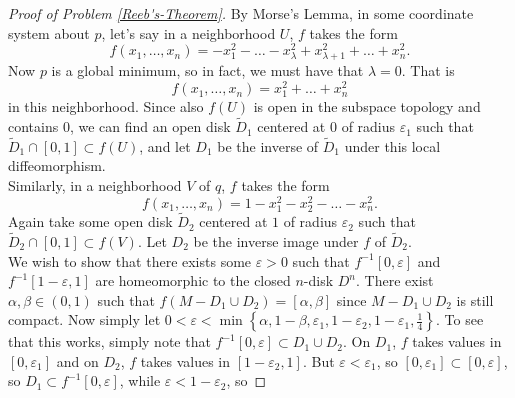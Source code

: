 \documentclass[reqno]{amsart}
\theoremstyle{definition}
\theoremstyle{remark}
\begin{document}
\begin{proof}[Proof of Problem \ref{Reeb's-Theorem}]
        By Morse's Lemma, in some coordinate system about
         $p$, let's say in a neighborhood $U$,
         $f$ takes the form
         \[
         f\left( x_1,\ldots,x_n \right) = 
         - x_1^2 - \ldots - x_{\lambda}^2 +
         x_{\lambda+1}^2 +\ldots + x_n^2.
         \] 
         Now $p$ is a global minimum, so in fact, we
         must have that $\lambda = 0$. That is
         \[
         f\left( x_1,\ldots,x_n \right) =
         x_{1}^2 + \ldots + x_n^2
         \] 
         in this neighborhood.
         Since also
         $f(U)$ is open in the subspace topology
         and contains $0$,
         we can find an open disk $\tilde{D}_1$ centered
         at $0$ of radius $\varepsilon_1$ such that
         $ \tilde{D}_1 \cap \left[ 0,1 \right] \subset 
         f(U)$, and
         let $D_1$ be the inverse of $\tilde{D}_1$ under this
         local diffeomorphism.\\
         Similarly, in a neighborhood $V$ of
         $q$, $f$ takes the form
         \[
         f\left( x_1,\ldots,x_n \right)  = 
         1- x_1^2 - x_2^2 - \ldots - x_n^2.
         \] 
         Again take some open disk $\tilde{D}_2$
         centered at $1$ of radius $\varepsilon_2$ 
         such that $ \tilde{D}_2 \cap
         \left[ 0,1 \right] \subset f(V)$.
         Let $D_2$ be the inverse image under $f$ of
         $\tilde{D}_2$.\\
         We wish to show that there
         exists some $\varepsilon > 0$ such that
         $f^{-1}\left[ 0,\varepsilon \right] $ 
         and $f^{-1}\left[ 1-\varepsilon,1 \right] $ are
         homeomorphic to the closed $n$-disk $D^{n}$.
         There
         exist
         $\alpha, \beta \in \left( 0,1 \right) $ such that
         $f\left( M - D_1 \cup D_2 \right) 
         = \left[ \alpha, \beta \right] $ since
         $M - D_1 \cup  D_2$ is still compact.
         Now simply let
         $0 < \varepsilon < \min 
         \left\{ \alpha, 1 - \beta, \varepsilon_1,
         1-\varepsilon_2, 1-\varepsilon_1, \frac{1}{4}\right\} $.
         To see that this works, simply note that
         $f^{-1}\left[ 0, \varepsilon \right] 
         \subset D_1 \cup  D_2$.
         On $D_1$, $f$ takes values in
         $\left[ 0, \varepsilon_1 \right] $ and
         on $D_2$, $f$ takes values in
         $\left[ 1- \varepsilon_2 , 1 \right] $.
         But $\varepsilon < \varepsilon_1$, so
         $\left[ 0, \varepsilon_1 \right] \subset 
         \left[ 0, \varepsilon \right] $, so
         $D_1 \subset f^{-1}\left[ 0,\varepsilon \right] $,
         while
         $\varepsilon < 1- \varepsilon_2$, so

\end{proof}
\end{document}
